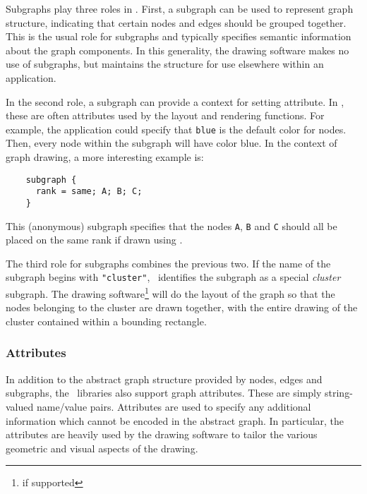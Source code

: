 Subgraphs play three roles in \gviz.
First, a subgraph can be used to represent graph structure, indicating that
certain nodes and edges should be grouped together. This is the usual
role for subgraphs and typically specifies semantic information about
the graph components. In this generality, the drawing software makes
no use of subgraphs, but maintains the structure for use elsewhere
within an application. 

In the second role, a subgraph can provide a context for setting 
attribute. In \gviz, these are often attributes used by the layout
and rendering functions.
For example, the application could specify that {\tt blue}
is the default color for nodes. Then, every node within the subgraph will
have color blue. In the context of graph drawing, a more interesting
example is:
\begin{verbatim}
    subgraph {
      rank = same; A; B; C;
    }
\end{verbatim}
This (anonymous) subgraph specifies that the nodes {\tt A}, {\tt B} and {\tt C} 
should all be placed on the same rank if drawn using \dot.

The third role for subgraphs combines the previous two. If the name of
the subgraph begins with {\tt "cluster"}, \gviz\ identifies the subgraph
as a special {\em cluster} subgraph. The drawing software\footnote{if
supported} will do the layout of the graph so that the nodes belonging
to the cluster are drawn together, with the entire drawing of the cluster
contained within a bounding rectangle.

\subsubsection{Attributes}
\label{sec:attributes}
In addition to the abstract graph structure provided by nodes, edges and
subgraphs, the \gviz\ libraries also support graph attributes. These
are simply string-valued name/value pairs. Attributes are used to specify
any additional information which cannot be encoded in the abstract graph.
In particular, the attributes are heavily used by the drawing software to
tailor the various geometric and visual aspects of the drawing.

